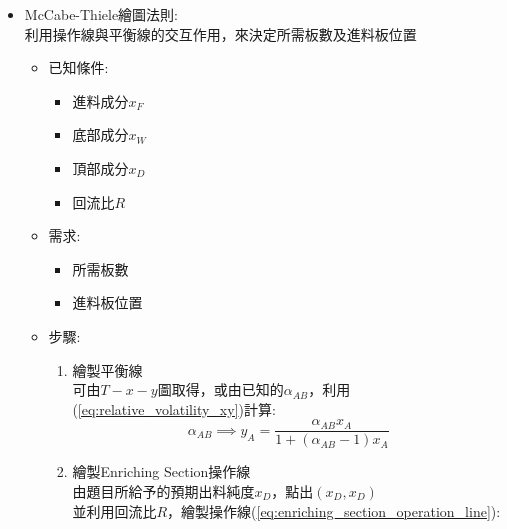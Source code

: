 \documentclass[../main.tex]{subfiles}
\begin{document}
\begin{itemize}
\begin{itemize}
\begin{figure}[H]
      \caption{各種進料狀態下的q-line操作線與平衡線示意圖}
    \end{figure}
    \item McCabe-Thiele繪圖法則:\\
    利用操作線與平衡線的交互作用，來決定所需板數及進料板位置
    \begin{itemize}
      \item 已知條件:
      \begin{itemize}
        \item 進料成分$x_F$
        \item 底部成分$x_W$
        \item 頂部成分$x_D$
        \item 回流比$R$
      \end{itemize}
      \item 需求:
      \begin{itemize}
        \item 所需板數
        \item 進料板位置
      \end{itemize}
      \item 步驟:
      \begin{enumerate}
        \item 繪製平衡線\\
        可由$T-x-y$圖取得，或由已知的$\alpha_{AB}$，利用(\ref{eq:relative_volatility_xy})計算:
        \begin{equation}
          \alpha_{AB} \implies y_A = \frac{\alpha_{AB} x_A}{1+(\alpha_{AB}-1)x_A}
        \end{equation}
        \item 繪製Enriching Section操作線\\
        由題目所給予的預期出料純度$x_D$，點出$(x_D,x_D)$\\
        並利用回流比$R$，繪製操作線(\ref{eq:enriching_section_operation_line}):
        \begin{equation}

\end{equation}
\end{enumerate}
\end{itemize}
\end{itemize}
\end{itemize}
\end{document}
